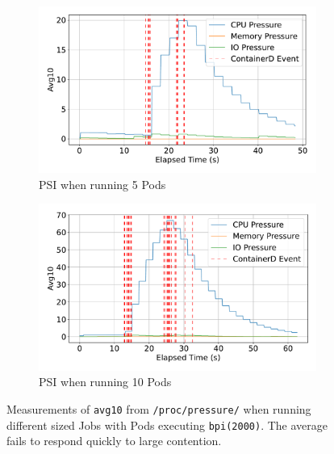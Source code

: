 \begin{figure}[ht!]
    \begin{subfigure}[b]{0.48\textwidth}
        \centering
        \includegraphics[width=\linewidth]{images/avg-pressure-smallbatch.pdf}
        \caption{PSI when running 5 Pods} %
        \label{fig:avg-pressure-smallbatch}
    \end{subfigure}%
    \hfill
    \begin{subfigure}[b]{0.48\textwidth}
        \centering
        \includegraphics[width=\linewidth]{images/avg-pressure-bigbatch.pdf}
        \caption{PSI when running 10 Pods} %
        \label{fig:avg-pressure-bigbatch}
    \end{subfigure}
    \caption{Measurements of \texttt{avg10} from \texttt{/proc/pressure/} when
    running different sized Jobs with Pods executing \texttt{bpi(2000)}. The
    average fails to respond quickly to large contention.} %
    \label{fig:pressure-avg}
\end{figure}


